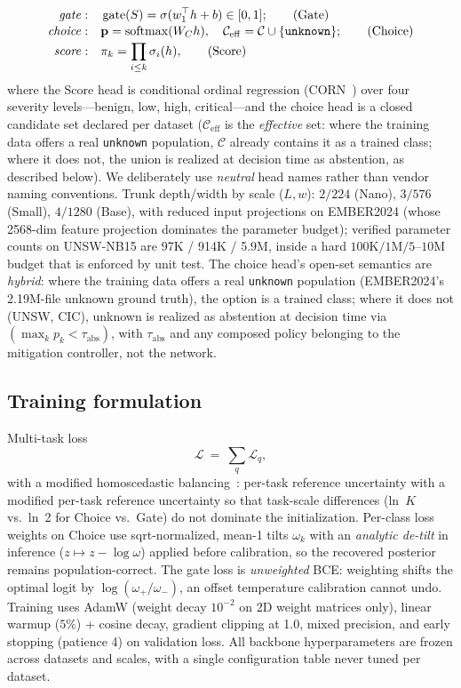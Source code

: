 \documentclass[sigconf,anonymous=false]{acmart}
\begin{document}
\begin{align}
\text{\emph{gate}}: \quad & \operatorname{gate}(S) = \sigma(w_1^{\top} h + b) \in [0,1]; \tag{Gate}\\[-2pt]
\text{\emph{choice}}: \quad & \mathbf{p} = \mathrm{softmax}(W_C h), \quad \mathcal{C}_{\mathrm{eff}} = \mathcal{C} \cup \{\texttt{unknown}\}; \tag{Choice}\\[-2pt]
\text{\emph{score}}: \quad & \pi_k = \prod_{i\le k} \sigma_i(h), \tag{Score}
\end{align}
where the Score head is conditional ordinal regression (CORN~\cite{shi2023corn}) over four severity levels---benign, low, high, critical---and the choice head is a closed candidate set declared per dataset ($\mathcal{C}_{\mathrm{eff}}$ is the \emph{effective} set: where the training data offers a real \texttt{unknown} population, $\mathcal{C}$ already contains it as a trained class; where it does not, the union is realized at decision time as abstention, as described below). We deliberately use \emph{neutral} head names rather than vendor naming conventions. Trunk depth/width by scale ($L,w$): $2/224$ (Nano), $3/576$ (Small), $4/1280$ (Base), with reduced input projections on EMBER2024 (whose 2568-dim feature projection dominates the parameter budget); verified parameter counts on UNSW-NB15 are 97K / 914K / 5.9M, inside a hard $100\mathrm{K}/1\mathrm{M}/5$--$10\mathrm{M}$ budget that is enforced by unit test. The choice head's open-set semantics are \emph{hybrid}: where the training data offers a real \texttt{unknown} population (EMBER2024's 2.19M-file unknown ground truth), the option is a trained class; where it does not (UNSW, CIC), unknown is realized as abstention at decision time via $(\max_k p_k < \tau_{\mathrm{abs}})$, with $\tau_{\mathrm{abs}}$ and any composed policy belonging to the mitigation controller, not the network.

\subsection{Training formulation}
Multi-task loss
\[
\mathcal{L} ~ = ~ \sum_q \mathcal{L}_q,
\]
with a modified homoscedastic balancing~\cite{kendall2018multitask}: per-task reference uncertainty
with a modified per-task reference uncertainty so that task-scale differences (ln~$K$ vs.\ ln~2 for Choice vs.\ Gate) do not dominate the initialization. Per-class loss weights on Choice use sqrt-normalized, mean-1 tilts $\omega_k$ with an \emph{analytic de-tilt} in inference ($z \mapsto z - \log\omega$) applied before calibration, so the recovered posterior remains population-correct. The gate loss is \emph{unweighted} BCE: weighting shifts the optimal logit by $\log(\omega_+/\omega_-)$, an offset temperature calibration cannot undo. Training uses AdamW (weight decay $10^{-2}$ on 2D weight matrices only), linear warmup ($5\%$) + cosine decay, gradient clipping at 1.0, mixed precision, and early stopping (patience 4) on validation loss. All backbone hyperparameters are frozen across datasets and scales, with a single configuration table never tuned per dataset.
\end{document}
